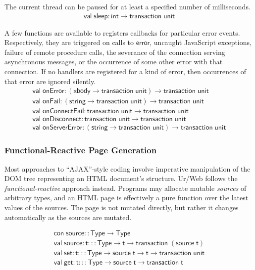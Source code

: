 \documentclass{article}
\newcommand{\mt}[1]{\mathsf{#1}}
\begin{document}
The current thread can be paused for at least a specified number of milliseconds.
$$\begin{array}{l}
  \mt{val} \; \mt{sleep} : \mt{int} \to \mt{transaction} \; \mt{unit}
\end{array}$$

A few functions are available to registers callbacks for particular error events.  Respectively, they are triggered on calls to $\mt{error}$, uncaught JavaScript exceptions, failure of remote procedure calls, the severance of the connection serving asynchronous messages, or the occurrence of some other error with that connection.  If no handlers are registered for a kind of error, then occurrences of that error are ignored silently.
$$\begin{array}{l}
  \mt{val} \; \mt{onError} : (\mt{xbody} \to \mt{transaction} \; \mt{unit}) \to \mt{transaction} \; \mt{unit} \\
  \mt{val} \; \mt{onFail} : (\mt{string} \to \mt{transaction} \; \mt{unit}) \to \mt{transaction} \; \mt{unit} \\
  \mt{val} \; \mt{onConnectFail} : \mt{transaction} \; \mt{unit} \to \mt{transaction} \; \mt{unit} \\
  \mt{val} \; \mt{onDisconnect} : \mt{transaction} \; \mt{unit} \to \mt{transaction} \; \mt{unit} \\
  \mt{val} \; \mt{onServerError} : (\mt{string} \to \mt{transaction} \; \mt{unit}) \to \mt{transaction} \; \mt{unit}
\end{array}$$

\subsubsection{Functional-Reactive Page Generation}

Most approaches to ``AJAX''-style coding involve imperative manipulation of the DOM tree representing an HTML document's structure.  Ur/Web follows the \emph{functional-reactive} approach instead.  Programs may allocate mutable \emph{sources} of arbitrary types, and an HTML page is effectively a pure function over the latest values of the sources.  The page is not mutated directly, but rather it changes automatically as the sources are mutated.

$$\begin{array}{l}
  \mt{con} \; \mt{source} :: \mt{Type} \to \mt{Type} \\
  \mt{val} \; \mt{source} : \mt{t} ::: \mt{Type} \to \mt{t} \to \mt{transaction} \; (\mt{source} \; \mt{t}) \\
  \mt{val} \; \mt{set} : \mt{t} ::: \mt{Type} \to \mt{source} \; \mt{t} \to \mt{t} \to \mt{transaction} \; \mt{unit} \\
  \mt{val} \; \mt{get} : \mt{t} ::: \mt{Type} \to \mt{source} \; \mt{t} \to \mt{transaction} \; \mt{t}
\end{array}$$
\end{document}
